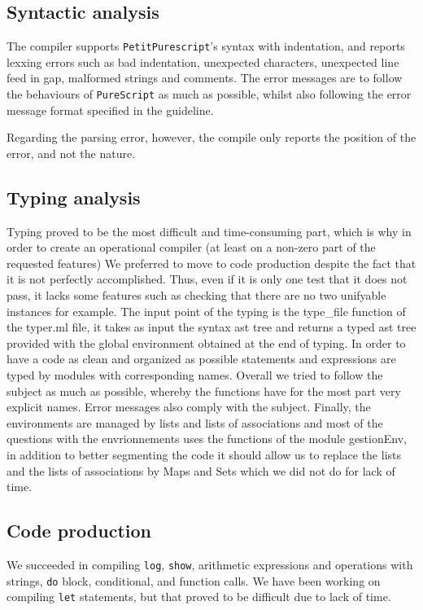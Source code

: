 \documentclass{amsart}
\begin{document}
	\subsection{Syntactic analysis}
	
	The compiler supports \texttt{PetitPurescript}'s syntax with indentation, and reports lexxing errors such as bad indentation, unexpected characters, unexpected line feed in gap, malformed strings and comments. The error messages are to follow the behaviours of \texttt{PureScript} as much as possible, whilst also following the error message format specified in the guideline.
	
	Regarding the parsing error, however, the compile only reports the position of the error, and not the nature.
	
	\subsection{Typing analysis}
	Typing proved to be the most difficult and time-consuming part, which is why in order to create an operational compiler (at least on a non-zero part of the requested features) We preferred to move to code production despite the fact that it is not perfectly accomplished. Thus, even if it is only one test that it does not pass, it lacks some features such as checking that there are no two unifyable instances for example. The input point of the typing is the type\_file function of the typer.ml file, it takes as input the syntax ast tree and returns a typed ast tree provided with the global environment obtained at the end of typing. In order to have a code as clean and organized as possible statements and expressions are typed by modules with corresponding names. Overall we tried to follow the subject as much as possible, whereby the functions have for the most part very explicit names. Error messages also comply with the subject. Finally, the environments are managed by lists and lists of associations and most of the questions with the envrionnements uses the functions of the module gestionEnv, in addition to better segmenting the code it should allow us to replace the lists and the lists of associations by Maps and Sets which we did not do for lack of time.	
	
	\subsection{Code production}
	We succeeded in compiling \texttt{log}, \texttt{show}, arithmetic expressions and operations with strings, \texttt{do} block, conditional, and function calls. We have been working on compiling \texttt{let} statements, but that proved to be difficult due to lack of time.
	
\end{document}
